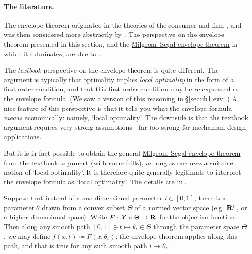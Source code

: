\paragraph{The literature.}
The envelope theorem originated in the theories of the consumer and firm \parencite{Hotelling1932,Roy1947,Shephard1953}, and was then considered more abstractly by \textcite{Samuelson1947}. 
The perspective on the envelope theorem presented in this section,
and the \hyperref[theorem:MS_envelope]{Milgrom--Segal envelope theorem} in which it culminates, are due to \textcite{MilgromSegal2002}.

The \emph{textbook} perspective on the envelope theorem
\parencite[e.g.][§M.L]{MascolellWhinstonGreen1995}
is quite different.
The argument is typically that optimality implies \emph{local optimality} in the form of a first-order condition,
and that this first-order condition may be re-expressed as the envelope formula.
(We saw a version of this reasoning in §\ref{sec:ch1:env}.)
A nice feature of this perspective is that it tells you what the envelope formula \emph{means} economically: namely, `local optimality'.
The downside is that the textbook argument requires very strong assumptions---far too strong for mechanism-design applications.

But it is in fact possible to obtain the general \hyperref[theorem:MS_envelope]{Milgrom--Segal envelope theorem} from the textbook argument (with some frills), as long as one uses a suitable notion of `local optimality'.
It is therefore quite generally legitimate to interpret the envelope formula as `local optimality'.
The details are in \textcite{Sinander2022}.


\begin{remark}
	\label{remark:env_param_higher}
	Suppose that instead of a one-dimensional parameter $t \in [0,1]$,
	there is a parameter $\theta$ drawn from a convex subset $\Theta$ of a normed vector space (e.g. $\mathbf{R}^n$, or a higher-dimensional space).
	Write $F : \mathcal{X} \times \Theta \to \mathbf{R}$ for the objective function.
	Then along any smooth path $[0,1] \ni t \mapsto \theta_t \in \Theta$ through the parameter space $\Theta$,
	we may define $f(x,t) \coloneqq F(x,\theta_t)$;
	the envelope theorem applies along this path,
	and that is true for any such smooth path $t \mapsto \theta_t$.
\end{remark}

